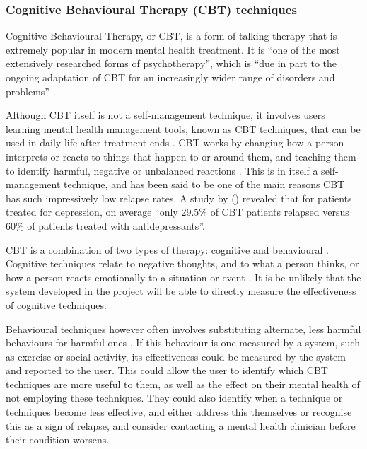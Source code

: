\documentclass[11pt,openright,a4paper]{report}
\begin{document}
\subsubsection{Cognitive Behavioural Therapy (CBT) techniques}
Cognitive Behavioural Therapy, or CBT, is a form of talking therapy that is extremely popular in modern mental health treatment. It is \enquote{one of the most extensively researched forms of psychotherapy}, which is \enquote{due in part to the ongoing adaptation of CBT for an increasingly
wider range of disorders and problems} \parencite{butler2006empirical}.

Although CBT itself is not a self-management technique, it involves users learning mental health management tools, known as CBT techniques, that can be used in daily life after treatment ends \parencite{babcpcbt}. CBT works by changing how a person interprets or reacts to things that happen to or around them, and teaching them to identify harmful, negative or unbalanced reactions \parencite{nhscbt}. This is in itself a self-management technique, and has been said to be one of the main reasons CBT has such impressively low relapse rates. A study by \citeauthor{butler2006empirical} (\citeyear{butler2006empirical}) revealed that for patients treated for depression, on average \enquote{only 29.5\% of CBT patients relapsed versus 60\% of patients treated with antidepressants}.

CBT is a combination of two types of therapy: cognitive and behavioural \parencite{patientcbt}. Cognitive techniques relate to negative thoughts, and to what a person thinks, or how a person reacts emotionally to a situation or event \parencite{medscapecbt}. It is be unlikely that the system developed in the project will be able to directly measure the effectiveness of cognitive techniques.

Behavioural techniques however often involves substituting alternate, less harmful behaviours for harmful ones \parencite{patientcbt}. If this behaviour is one measured by a system, such as exercise or social activity, its effectiveness could be measured by the system and reported to the user. This could allow the user to identify which CBT techniques are more useful to them, as well as the effect on their mental health of not employing these techniques. They could also identify when a technique or techniques become less effective, and either address this themselves or recognise this as a sign of relapse, and consider contacting a mental health clinician before their condition worsens.
\end{document}
